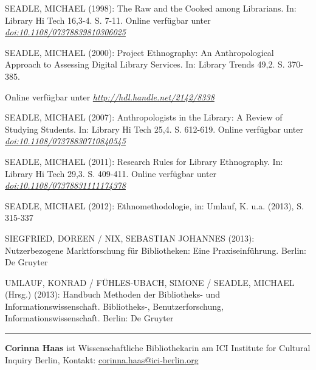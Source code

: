 \documentclass[a4paper,
fontsize=11pt,
oneside,
numbers=noperiodatend,
parskip=half-,
bibliography=totoc,
final
]{scrartcl}
\begin{document}
SEADLE, MICHAEL (1998): The Raw and the Cooked among Librarians. In:
Library Hi Tech 16,3-4. S. 7-11. Online verfügbar unter
\href{http://dx.doi.org/10.1108/07378839810306025}{\emph{doi:10.1108/07378839810306025}}

SEADLE, MICHAEL (2000): Project Ethnography: An Anthropological Approach
to Assessing Digital Library Services. In: Library Trends 49,2. S.
370-385. 

Online verfügbar unter
\href{http://hdl.handle.net/2142/8338}{\emph{http://hdl.handle.net/2142/8338}}

SEADLE, MICHAEL (2007): Anthropologists in the Library: A Review of
Studying Students. In: Library Hi Tech 25,4. S. 612-619. Online
verfügbar unter
\href{http://dx.doi.org/10.1108/07378830710840545}{\emph{doi:10.1108/07378830710840545}}

SEADLE, MICHAEL (2011): Research Rules for Library Ethnography. In:
Library Hi Tech 29,3. S. 409-411. Online verfügbar unter
\href{http://dx.doi.org/10.1108/07378831111174378}{\emph{doi:10.1108/07378831111174378}}

SEADLE, MICHAEL (2012): Ethnomethodologie, in: Umlauf, K. u.a. (2013),
S. 315-337

SIEGFRIED, DOREEN / NIX, SEBASTIAN JOHANNES (2013): Nutzerbezogene
Marktforschung für Bibliotheken: Eine Praxiseinführung. Berlin: De
Gruyter

UMLAUF, KONRAD / FÜHLES-UBACH, SIMONE / SEADLE, MICHAEL (Hrsg.) (2013):
Handbuch Methoden der Bibliotheks- und Informationswissenschaft.
Bibliotheks-, Benutzerforschung, Informationswissenschaft. Berlin: De
Gruyter

\begin{center}\rule{0.5\linewidth}{\linethickness}\end{center}

\textbf{Corinna Haas} ist Wissenschaftliche Bibliothekarin am ICI
Institute for Cultural Inquiry Berlin, Kontakt:
\url{corinna.haas@ici-berlin.org}
\end{document}

